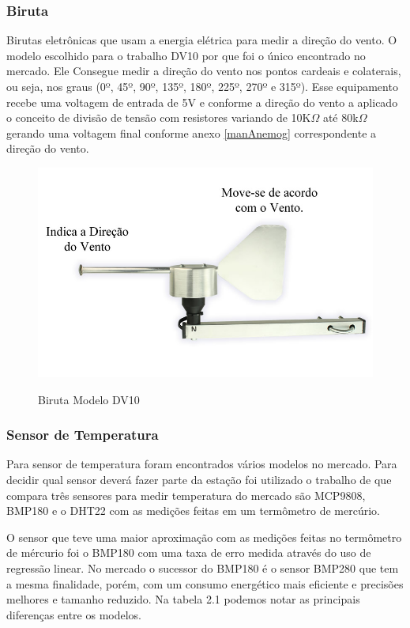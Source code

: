 \subsubsection{Biruta}

Birutas eletrônicas que usam a energia elétrica para medir a direção do vento. O modelo escolhido para o trabalho DV10 por que foi o único encontrado no mercado. Ele Consegue medir a direção do vento nos pontos cardeais e colaterais, ou seja, nos graus (0º, 45º, 90º, 135º, 180º, 225º, 270º e 315º). Esse equipamento recebe uma voltagem de entrada de 5V e conforme a direção do vento a aplicado o conceito de divisão de tensão com resistores variando de 10K$\Omega$ até 80k$\Omega$ gerando uma voltagem final conforme anexo \ref{manAnemog} correspondente a direção do vento.

\begin{figure} [!h]
    \centering
    \caption{Biruta Modelo DV10}
    \includegraphics[scale=0.25]{Figuras/posicao-da-pa-e-indicacao.jpg}
    \label{fig:biruta}
\end{figure}


\subsubsection{Sensor de Temperatura}

Para sensor de temperatura foram encontrados vários modelos no mercado. Para decidir qual sensor deverá fazer parte da estação foi utilizado o trabalho de \cite{konstantinoscomparative} que compara três sensores para medir temperatura do mercado são MCP9808, BMP180 e o DHT22 com as medições feitas em um termômetro de mercúrio.

O sensor que teve uma maior aproximação com as medições feitas no termômetro de mércurio foi o BMP180 com uma taxa de erro medida através do uso de regressão linear. No mercado o sucessor do BMP180 é o sensor BMP280 que tem a mesma finalidade, porém, com um consumo energético mais eficiente e precisões melhores e tamanho reduzido. Na tabela 2.1 podemos notar as principais diferenças entre os modelos.

